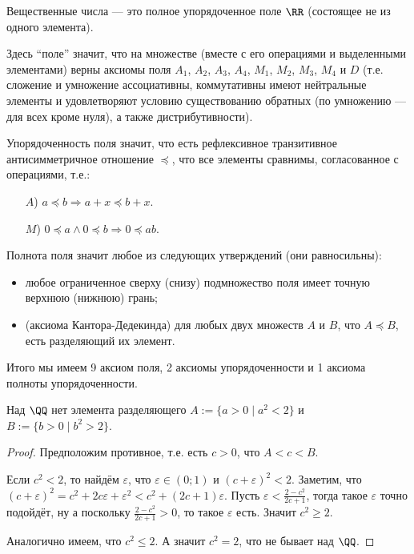 \documentclass[12pt,a4paper]{article}
\begin{document}
    \begin{definition}
        Вещественные числа --- это полное упорядоченное поле $\RR$ (состоящее не из одного элемента).
        
        Здесь ``поле'' значит, что на множестве (вместе с его операциями и выделенными элементами) верны аксиомы поля $A_1$, $A_2$, $A_3$, $A_4$, $M_1$, $M_2$, $M_3$, $M_4$ и $D$ (т.е. сложение и умножение ассоциативны, коммутативны имеют нейтральные элементы и удовлетворяют условию существованию обратных (по умножению --- для всех кроме нуля), а также дистрибутивности).
        
        Упорядоченность поля значит, что есть рефлексивное транзитивное антисимметричное отношение $\preccurlyeq$, что все элементы сравнимы, согласованное с операциями, т.е.:
        \begin{itemize}
            \item[$A$)] $a \preccurlyeq b \Rightarrow a + x \preccurlyeq b + x$.
            \item[$M$)] $0 \preccurlyeq a \wedge 0 \preccurlyeq b \Rightarrow 0 \preccurlyeq ab$.
        \end{itemize}

        Полнота поля значит любое из следующих утверждений (они равносильны):
        \begin{itemize}
            \item любое ограниченное сверху (снизу) подмножество поля имеет точную верхнюю (нижнюю) грань;
            \item (аксиома Кантора-Дедекинда) для любых двух множеств $A$ и $B$, что $A \preccurlyeq B$, есть разделяющий их элемент.
        \end{itemize}

        Итого мы имеем 9 аксиом поля, 2 аксиомы упорядоченности и 1 аксиома полноты упорядоченности.
    \end{definition}

    \begin{statement*}
        Над $\QQ$ нет  элемента разделяющего $A := \{a > 0 \mid a^2 < 2\}$ и $B := \{b > 0 \mid b^2 > 2\}$.
    \end{statement*}

    \begin{proof}
        Предположим противное, т.е. есть $c > 0$, что $A < c < B$.

        Если $c^2 < 2$, то найдём $\varepsilon$, что $\varepsilon \in (0; 1)$ и $(c + \varepsilon)^2 < 2$. Заметим, что $(c + \varepsilon)^2 = c^2 + 2c\varepsilon + \varepsilon^2 < c^2 + (2c + 1)\varepsilon$. Пусть $\varepsilon < \frac{2 - c^2}{2c+ 1}$, тогда такое $\varepsilon$ точно подойдёт, ну а поскольку $\frac{2 - c^2}{2c + 1} > 0$, то такое $\varepsilon$ есть. Значит $c^2 \geqslant 2$.
        
        Аналогично имеем, что $c^2 \leqslant 2$. А значит $c^2 = 2$, что не бывает над $\QQ$.
    \end{proof}
\end{document}
